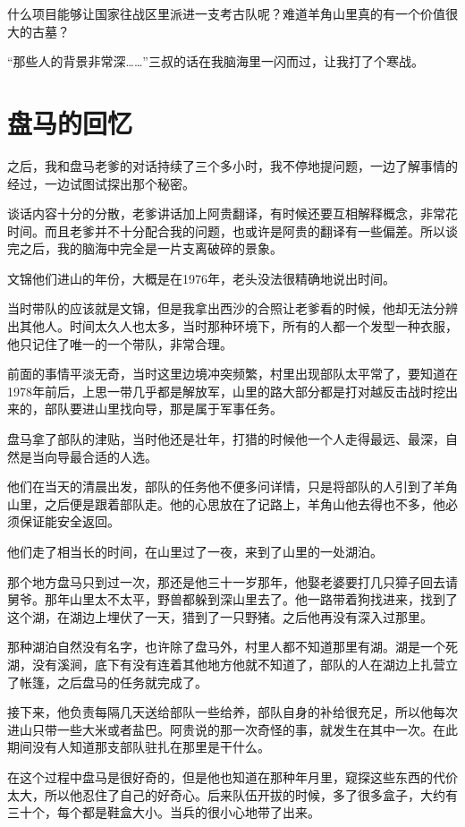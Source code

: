 什么项目能够让国家往战区里派进一支考古队呢？难道羊角山里真的有一个价值很大的古墓？

“那些人的背景非常深……”三叔的话在我脑海里一闪而过，让我打了个寒战。

\chapter{盘马的回忆}

之后，我和盘马老爹的对话持续了三个多小时，我不停地提问题，一边了解事情的经过，一边试图试探出那个秘密。

谈话内容十分的分散，老爹讲话加上阿贵翻译，有时候还要互相解释概念，非常花时间。而且老爹并不十分配合我的问题，也或许是阿贵的翻译有一些偏差。所以谈完之后，我的脑海中完全是一片支离破碎的景象。

文锦他们进山的年份，大概是在1976年，老头没法很精确地说出时间。

当时带队的应该就是文锦，但是我拿出西沙的合照让老爹看的时候，他却无法分辨出其他人。时间太久人也太多，当时那种环境下，所有的人都一个发型一种衣服，他只记住了唯一的一个带队，非常合理。

前面的事情平淡无奇，当时这里边境冲突频繁，村里出现部队太平常了，要知道在1978年前后，上思一带几乎都是解放军，山里的路大部分都是打对越反击战时挖出来的，部队要进山里找向导，那是属于军事任务。

盘马拿了部队的津贴，当时他还是壮年，打猎的时候他一个人走得最远、最深，自然是当向导最合适的人选。

他们在当天的清晨出发，部队的任务他不便多问详情，只是将部队的人引到了羊角山里，之后便是跟着部队走。他的心思放在了记路上，羊角山他去得也不多，他必须保证能安全返回。

他们走了相当长的时间，在山里过了一夜，来到了山里的一处湖泊。

那个地方盘马只到过一次，那还是他三十一岁那年，他娶老婆要打几只獐子回去请舅爷。那年山里太不太平，野兽都躲到深山里去了。他一路带着狗找进来，找到了这个湖，在湖边上埋伏了一天，猎到了一只野猪。之后他再没有深入过那里。

那种湖泊自然没有名字，也许除了盘马外，村里人都不知道那里有湖。湖是一个死湖，没有溪涧，底下有没有连着其他地方他就不知道了，部队的人在湖边上扎营立了帐篷，之后盘马的任务就完成了。

接下来，他负责每隔几天送给部队一些给养，部队自身的补给很充足，所以他每次进山只带一些大米或者盐巴。阿贵说的那一次奇怪的事，就发生在其中一次。在此期间没有人知道那支部队驻扎在那里是干什么。

在这个过程中盘马是很好奇的，但是他也知道在那种年月里，窥探这些东西的代价太大，所以他忍住了自己的好奇心。后来队伍开拔的时候，多了很多盒子，大约有三十个，每个都是鞋盒大小。当兵的很小心地带了出来。

